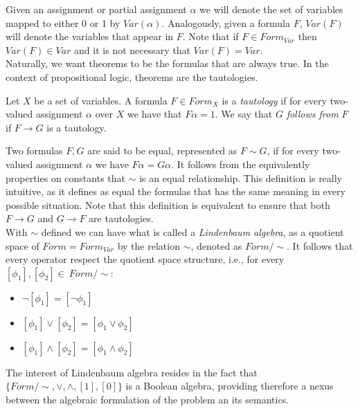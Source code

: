 Given an assignment or partial assignment $\alpha$ we will denote the set of variables mapped to either 0 or 1 by $Var(\alpha)$. Analogously, given a formula $F$, $Var(F)$ will denote the variables that appear in $F$. Note that if $F\in Form_{Var}$ then $Var(F)\in Var$ and it is not necessary that $Var(F)=Var$.\\

Naturally, we want theorems to be the formulas that are always true. In the context of propositional logic, theorems are the tautologies.   

  \begin{definition}
    Let $X$ be a set of variables. A formula $F\in Form_X$ is a \emph{tautology} if for every two-valued assignment $\alpha$ over $X$ we have that $F\alpha=1$. We say that $G$ \emph{follows from} $F$ if $F\to G$ is a tautology. 
  \end{definition}


  
Two formulas $F,G$ are said to be equal, represented as $F\sim G$, if for every two-valued assignment $\alpha$ we have $F\alpha = G\alpha$. It follows from the equivalently properties on constants that $\sim$ is an equal relationship. This definition is really intuitive, as it defines as equal the formulas that has the same meaning in every possible situation. Note that this definition is equivalent to ensure that both $F\to G$ and $G\to F$ are tautologies.\\



\label{def:linden}
With $\sim$ defined we can have what is called a \emph{Lindenbaum algebra}, as a quotient space of $Form = Form_{Var}$ by the relation $\sim$, denoted as $Form/\sim$. It follows that every operator respect the quotient space structure, i.e., for every $[\phi_1],[\phi_2]\in\ Form/\sim$:

\begin{itemize}
\item $\neg [\phi_1] = [\neg\phi_1]$
\item $ [\phi_1] \vee [\phi_2]= [\phi_1 \vee \phi_2]$
\item $ [\phi_1] \wedge [\phi_2]= [\phi_1 \wedge \phi_2]$
\end{itemize}

The interest of Lindenbaum algebra resides in the fact that $\{Form/\sim, \vee,\wedge,[1],[0]\}$ is a Boolean algebra, providing therefore a nexus between the algebraic formulation of the problem an its semantics.










